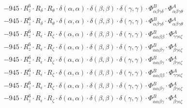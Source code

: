 \documentclass{article}
\begin{document}
\begin{subequations}
\begin{gather}
\begin{array}{c}
 \\[0.2em] 		 - 945 \cdot R_{z}^{6} \cdot R_{\delta{}} \cdot R_{\theta{}} \cdot \delta{}\left(\alpha{}, \alpha{}\right) \cdot \delta{}\left(\beta{}, \beta{}\right) \cdot \delta{}\left(\gamma{}, \gamma{}\right) \cdot \Phi{}^{B}_{\alpha{}\beta{}\gamma{}\delta{}} \cdot \Phi{}^{A}_{\alpha{}\beta{}\gamma{}\theta{}} 
 \\[0.2em] 		 - 945 \cdot R_{z}^{6} \cdot R_{\delta{}} \cdot R_{\theta{}} \cdot \delta{}\left(\alpha{}, \alpha{}\right) \cdot \delta{}\left(\beta{}, \beta{}\right) \cdot \delta{}\left(\gamma{}, \gamma{}\right) \cdot \Phi{}^{B}_{\alpha{}\beta{}\gamma{}\delta{}} \cdot \Phi{}^{A}_{\alpha{}\beta{}\gamma{}\theta{}} 
 \\[0.2em] 		 - 945 \cdot R_{z}^{6} \cdot R_{\epsilon{}} \cdot R_{\zeta{}} \cdot \delta{}\left(\alpha{}, \alpha{}\right) \cdot \delta{}\left(\beta{}, \beta{}\right) \cdot \delta{}\left(\gamma{}, \gamma{}\right) \cdot \Phi{}^{B}_{\alpha{}\alpha{}\beta{}\beta{}} \cdot \Phi{}^{A}_{\gamma{}\gamma{}\epsilon{}\zeta{}} 
 \\[0.2em] 		 - 945 \cdot R_{z}^{6} \cdot R_{\epsilon{}} \cdot R_{\zeta{}} \cdot \delta{}\left(\alpha{}, \alpha{}\right) \cdot \delta{}\left(\beta{}, \beta{}\right) \cdot \delta{}\left(\gamma{}, \gamma{}\right) \cdot \Phi{}^{B}_{\alpha{}\alpha{}\beta{}\gamma{}} \cdot \Phi{}^{A}_{\beta{}\gamma{}\epsilon{}\zeta{}} 
 \\[0.2em] 		 - 945 \cdot R_{z}^{6} \cdot R_{\epsilon{}} \cdot R_{\zeta{}} \cdot \delta{}\left(\alpha{}, \alpha{}\right) \cdot \delta{}\left(\beta{}, \beta{}\right) \cdot \delta{}\left(\gamma{}, \gamma{}\right) \cdot \Phi{}^{B}_{\alpha{}\alpha{}\beta{}\gamma{}} \cdot \Phi{}^{A}_{\beta{}\gamma{}\epsilon{}\zeta{}} 
 \\[0.2em] 		 - 945 \cdot R_{z}^{6} \cdot R_{\epsilon{}} \cdot R_{\zeta{}} \cdot \delta{}\left(\alpha{}, \alpha{}\right) \cdot \delta{}\left(\beta{}, \beta{}\right) \cdot \delta{}\left(\gamma{}, \gamma{}\right) \cdot \Phi{}^{B}_{\alpha{}\alpha{}\beta{}\beta{}} \cdot \Phi{}^{A}_{\gamma{}\gamma{}\epsilon{}\zeta{}} 
 \\[0.2em] 		 - 945 \cdot R_{z}^{6} \cdot R_{\epsilon{}} \cdot R_{\zeta{}} \cdot \delta{}\left(\alpha{}, \alpha{}\right) \cdot \delta{}\left(\beta{}, \beta{}\right) \cdot \delta{}\left(\gamma{}, \gamma{}\right) \cdot \Phi{}^{B}_{\alpha{}\alpha{}\beta{}\gamma{}} \cdot \Phi{}^{A}_{\beta{}\gamma{}\epsilon{}\zeta{}} 
 \\[0.2em] 		 - 945 \cdot R_{z}^{6} \cdot R_{\epsilon{}} \cdot R_{\zeta{}} \cdot \delta{}\left(\alpha{}, \alpha{}\right) \cdot \delta{}\left(\beta{}, \beta{}\right) \cdot \delta{}\left(\gamma{}, \gamma{}\right) \cdot \Phi{}^{B}_{\alpha{}\alpha{}\beta{}\gamma{}} \cdot \Phi{}^{A}_{\beta{}\gamma{}\epsilon{}\zeta{}} 

\end{array}
\end{gather}
\end{subequations}
\end{document}
